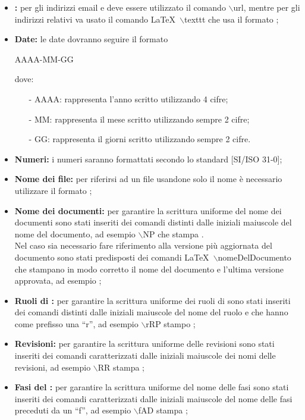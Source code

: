 \begin{itemize}
\item \textbf{:} per gli indirizzi email e  deve essere utilizzato il comando $\backslash$url, mentre per gli indirizzi relativi va usato il comando \LaTeX~$\backslash$texttt che usa il formato ;
\item \textbf{Date:} le date dovranno seguire il formato
\begin{center}
AAAA-MM-GG
\end{center}
dove:
\begin{itemize}
\item[-] AAAA: rappresenta l'anno scritto utilizzando 4 cifre;
\item[-] MM: rappresenta il mese scritto utilizzando sempre 2 cifre;
\item[-] GG: rappresenta il giorni scritto utilizzando sempre 2 cifre.
\end{itemize}
\item \textbf{Numeri:} i numeri saranno formattati secondo lo standard [SI/ISO 31-0];
\item \textbf{Nome dei file:} per riferirsi ad un file usandone solo il nome è necessario utilizzare il formato ;
\item \textbf{Nome dei documenti:} per garantire la scrittura uniforme del nome dei documenti sono stati inseriti dei comandi distinti dalle iniziali maiuscole del nome del documento, ad esempio $\backslash$NP che stampa \NP. \\
Nel caso sia necessario fare riferimento alla versione più aggiornata del documento sono stati predisposti dei comandi \LaTeX~$\backslash$nomeDelDocumento che stampano in modo corretto il nome del documento e l'ultima versione approvata, ad esempio \normeDiProgetto;
\item \textbf{Ruoli di :} per garantire la scrittura uniforme dei ruoli di  sono stati inseriti dei comandi distinti dalle iniziali maiuscole del nome del ruolo e che hanno come prefisso una ``r'', ad esempio $\backslash$rRP stampo \rRP;
\item \textbf{Revisioni:} per garantire la scrittura uniforme delle revisioni sono stati inseriti dei comandi caratterizzati dalle iniziali maiuscole dei nomi delle revisioni, ad esempio $\backslash$RR stampa \RR;
\item \textbf{Fasi del :} per garantire la scrittura uniforme del nome delle fasi sono stati inseriti dei comandi caratterizzati dalle iniziali maiuscole del nome delle fasi preceduti da un ``f'', ad esempio $\backslash$fAD stampa \fAD;

\end{itemize}
